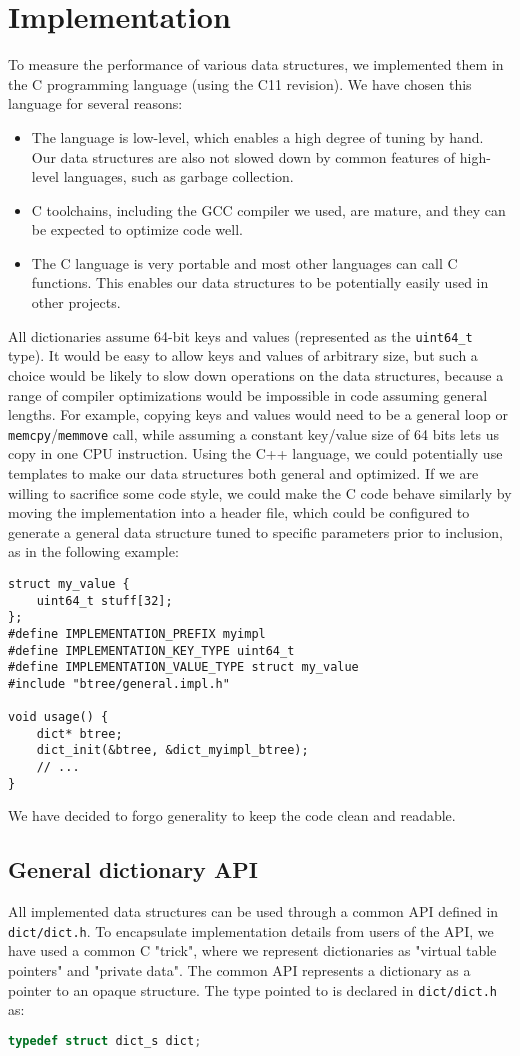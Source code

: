 \chapter{Implementation}
To measure the performance of various data structures, we implemented them
in the C programming language (using the C11 revision).
We have chosen this language for several reasons:
\begin{itemize}
\item The language is low-level, which enables a high degree of tuning by hand.
	Our data structures are also not slowed down by common features of
	high-level languages, such as garbage collection.
\item C toolchains, including the GCC compiler we used, are mature, and they
	can be expected to optimize code well.
\item The C language is very portable and most other languages can
	call C functions. This enables our data structures to be potentially
	easily used in other projects.
\end{itemize}
All dictionaries assume 64-bit keys and values (represented as the
\texttt{uint64\_t} type). It would be easy to allow keys and values of arbitrary
size, but such a choice would be likely to slow down operations on
the data structures, because a range of compiler optimizations would
be impossible in code assuming general lengths. For example, copying
keys and values would need to be a general loop or
\texttt{memcpy}/\texttt{memmove} call, while assuming a constant key/value
size of 64 bits lets us copy in one CPU instruction. Using the C++ language,
we could potentially use templates to make our data structures both general
and optimized. If we are willing to sacrifice some code style, we could
make the C code behave similarly by moving the implementation into a header
file, which could be configured to generate a general data structure
tuned to specific parameters prior to inclusion, as in the following example:
\begin{lstlisting}
struct my_value {
	uint64_t stuff[32];
};
#define IMPLEMENTATION_PREFIX myimpl
#define IMPLEMENTATION_KEY_TYPE uint64_t
#define IMPLEMENTATION_VALUE_TYPE struct my_value
#include "btree/general.impl.h"

void usage() {
	dict* btree;
	dict_init(&btree, &dict_myimpl_btree);
	// ...
}
\end{lstlisting}
We have decided to forgo generality to keep the code clean and readable.

\section{General dictionary API}
All implemented data structures can be used through a common API defined
in \texttt{dict/dict.h}. To encapsulate implementation details from
users of the API, we have used a common C "trick", where we represent
dictionaries as "virtual table pointers" and "private data".
The common API represents a dictionary as a pointer to an opaque structure.
The type pointed to is declared in \texttt{dict/dict.h} as:
\begin{lstlisting}[language=C]
typedef struct dict_s dict;
\end{lstlisting}


